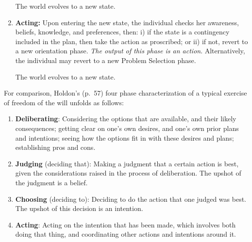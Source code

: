 \documentclass[
11pt,
titlepage,
reqno,
]{article}%
\theoremstyle{definition}
\begin{document}
\begin{enumerate}
		The world evolves to a new state.
		
		\item \textbf{Acting:} 
		Upon entering the new state, the individual checks her  awareness, beliefs, knowledge, and preferences, then: i) if the state is a contingency included in the plan, then take the action as proscribed; or ii) if not, revert to a new orientation phase.
		\textit{The output of this phase is an action}.
		Alternatively, the individual may revert to a  new Problem Selection phase.
		
		The world evolves to a new state.
	\end{enumerate}
	
	For comparison, Holdon's (p.\ 57) four phase characterization of a typical exercise of freedom of the will unfolds as follows: 
	\begin{enumerate}
		\item \textbf{Deliberating}: Considering the options that are available, and their likely consequences; getting clear on one’s own desires, and one’s own prior plans and intentions; seeing how the options ﬁt in with these desires and plans; establishing pros and cons. 
		\item \textbf{Judging} (deciding that): Making a judgment that a certain action is best, given the considerations raised in the process of deliberation. 
		The upshot of the judgment is a belief. 
		\item \textbf{Choosing} (deciding to): Deciding to do the action that one judged was best. 
		The upshot of this decision is an intention. 
		\item \textbf{Acting}: Acting on the intention that has been made, which involves both doing that thing, and coordinating other actions and intentions around it.
	\end{enumerate}
	
\end{document}
